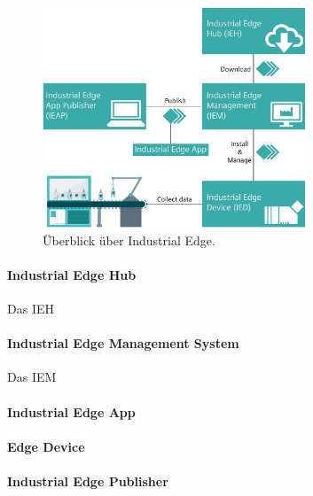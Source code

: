 		\begin{figure}[h]
			\centering
			\includegraphics[width=0.70\textwidth]{"Bilder/Edge_uebersicht.jpg"}
			\caption{Überblick über Industrial Edge. \cite{siemensIEM_gettingStarted}}
			\label{fig:Grundlagen:IndustrialEdge:Ueberblick}					
		\end{figure}
	
			
		\paragraph{Industrial Edge Hub}
			Das \gls{IEH} 
			
		\paragraph{Industrial Edge Management System}
			Das \gls{IEM} 
			
		\paragraph{Industrial Edge App}
			
	
		\paragraph{Edge Device}
			
			
		\paragraph{Industrial Edge Publisher}
			

